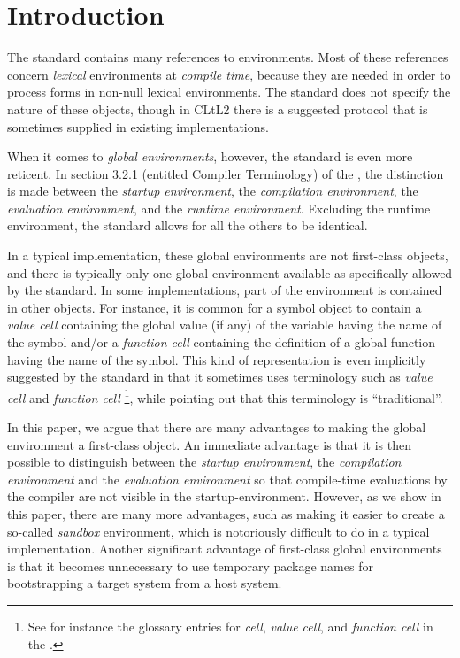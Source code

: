 \section{Introduction}

The \commonlisp{} standard contains many references to environments.
Most of these references concern \emph{lexical} environments at
\emph{compile time}, because they are needed in order to process forms
in non-null lexical environments.  The standard does not specify the
nature of these objects, though in CLtL2 \cite{Steele:1990:CLL:95411}
there is a suggested protocol that is sometimes supplied in existing
\commonlisp{} implementations. 

When it comes to \emph{global environments}, however, the standard is
even more reticent.  In section 3.2.1 (entitled Compiler Terminology)
of the \commonlisp{} \hs{}, the distinction is made between the
\emph{startup environment}, the \emph{compilation environment}, the
\emph{evaluation environment}, and the \emph{runtime environment}.
Excluding the runtime environment, the standard allows for all the
others to be identical.

In a typical \commonlisp{} implementation, these global environments
are not first-class objects, and there is typically only one global
environment available as specifically allowed by the standard.  In some
implementations, part of the environment is contained in other
objects.  For instance, it is common for a symbol object to contain a
\emph{value cell} containing the global value (if any) of the variable
having the name of the symbol and/or a \emph{function cell} containing
the definition of a global function having the name of the symbol.
This kind of representation is even implicitly suggested by the
standard in that it sometimes uses terminology such as \emph{value
  cell} and \emph{function cell}%
\footnote{See for instance the glossary entries for \emph{cell},
  \emph{value cell}, and \emph{function cell} in the
  \hs{}.},  while pointing out that this terminology is ``traditional''.

In this paper, we argue that there are many advantages to making the
global environment a first-class object.  An immediate advantage is
that it is then possible to distinguish between the \emph{startup
  environment}, the \emph{compilation environment} and the
\emph{evaluation environment} so that compile-time evaluations by the
compiler are not visible in the startup-environment.  However, as we
show in this paper, there are many more advantages, such as making it
easier to create a so-called \emph{sandbox} environment, which is
notoriously difficult to do in a typical \commonlisp{}
implementation.  Another significant advantage of first-class global
environments is that it becomes unnecessary to use temporary package
names for bootstrapping a target \commonlisp{} system from a host
\commonlisp{} system.

